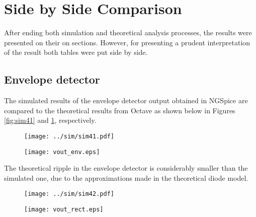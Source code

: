 \section{Side by Side Comparison}
\label{sec:comparison}

After ending both simulation and theoretical analysis processes, the results were presented on their on sections. However, for presenting a prudent interpretation of the result both tables were put side by side.

\subsection{Envelope detector}

The simulated results of the envelope detector output obtained in NGSpice are compared to the theoretical results from Octave as shown below in Figures \ref{fig:sim41} and \ref{fig:vout_env}, respectively.

\begin{figure} [ht]
\centering
\begin{minipage}{.5\textwidth}
  \centering
  \texttt{[image: ../sim/sim41.pdf]}
  \label{fig:sim41}
\end{minipage}%
\begin{minipage}{.5\textwidth}
  \centering
  \texttt{[image: vout\_env.eps]}
  \label{fig:vout_env}
\end{minipage}
\end{figure}

The theoretical ripple in the envelope detector is considerably smaller than the simulated one, due to the approximations made in the theoretical diode model.

\begin{figure}
\centering
\begin{minipage}{.5\textwidth}
  \centering
  \texttt{[image: ../sim/sim42.pdf]}
  \label{fig:sim_error}
\end{minipage}%
\begin{minipage}{.5\textwidth}
  \centering
  \texttt{[image: vout\_rect.eps]}
  \label{fig:theo_error}
\end{minipage}
\end{figure}

